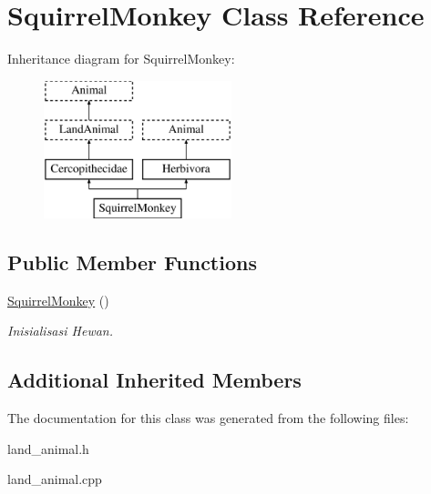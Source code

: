 \hypertarget{class_squirrel_monkey}{}\section{Squirrel\+Monkey Class Reference}
\label{class_squirrel_monkey}
Inheritance diagram for Squirrel\+Monkey\+:\begin{figure}[H]
\begin{center}
\leavevmode
\includegraphics[height=4.000000cm]{class_squirrel_monkey}
\end{center}
\end{figure}
\subsection*{Public Member Functions}
\begin{DoxyCompactItemize}
\item 
\hyperlink{class_squirrel_monkey_afe630290b17ed0802a1377da5f654629}{Squirrel\+Monkey} ()\hypertarget{class_squirrel_monkey_afe630290b17ed0802a1377da5f654629}{}\label{class_squirrel_monkey_afe630290b17ed0802a1377da5f654629}

\begin{DoxyCompactList}\small\item\em Inisialisasi Hewan. \end{DoxyCompactList}\end{DoxyCompactItemize}
\subsection*{Additional Inherited Members}


The documentation for this class was generated from the following files\+:\begin{DoxyCompactItemize}
\item 
land\+\_\+animal.\+h\item 
land\+\_\+animal.\+cpp\end{DoxyCompactItemize}

